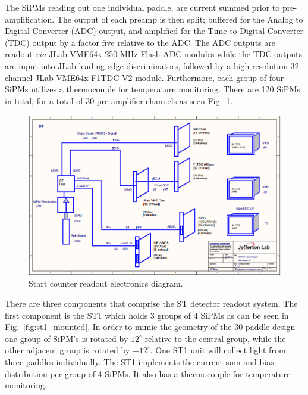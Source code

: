 The SiPMs reading out one individual paddle, are current summed prior to pre-amplification.  The output of each preamp is then split; buffered for the Analog to Digital Converter (ADC) output, and amplified for the Time to Digital Converter (TDC) output by a factor five relative to the ADC.  The ADC outputs are readout \emph{via} JLab VME64x 250 MHz Flash ADC modules while the TDC outputs are input into JLab leading edge discriminators, followed by a high resolution 32 channel JLab VME64x F1TDC V2 module.  Furthermore, each group of four SiPMs utilizes a thermocouple for temperature monitoring. There are 120 SiPMs in total, for a total of 30 pre-amplifier channels as seen Fig.~\ref{fig:Start Counter Electronics}.
	\begin{figure}[!htb]
		\centering
		\includegraphics[width=1.0\columnwidth]{design/figs/ST_Electronics}
		\caption{Start counter readout electronics diagram.}
		\label{fig:Start Counter Electronics}
	\end{figure}

There are three components that comprise the ST detector readout system.  The first component is the ST1 which holds 3 groups of 4 SiPMs as can be seen in Fig.~\ref{fig:st1_mounted}.  In order to mimic the geometry of the 30 paddle design one group of SiPM's is rotated by $12^{\circ}$ relative to the central group, while the other adjacent group is rotated by $-12^{\circ}$.  One ST1 unit will collect light from three paddles individually.  The ST1 implements the current sum and bias distribution per group of 4 SiPMs.  It also has a thermocouple for temperature monitoring.  

